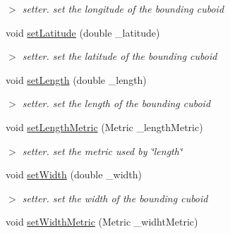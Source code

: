 \begin{DoxyCompactItemize}
\begin{DoxyCompactList}\small\item\em $>$ setter. set the longitude of the bounding cuboid \end{DoxyCompactList}\item 
\hypertarget{classCuboid_a723c412d9beb6e6e4cba2d743fb62f2a}{void \hyperlink{classCuboid_a723c412d9beb6e6e4cba2d743fb62f2a}{set\-Latitude} (double \-\_\-latitude)}\label{classCuboid_a723c412d9beb6e6e4cba2d743fb62f2a}

\begin{DoxyCompactList}\small\item\em $>$ setter. set the latitude of the bounding cuboid \end{DoxyCompactList}\item 
\hypertarget{classCuboid_afd2a9a5c2037b7f741301893436c5c95}{void \hyperlink{classCuboid_afd2a9a5c2037b7f741301893436c5c95}{set\-Length} (double \-\_\-length)}\label{classCuboid_afd2a9a5c2037b7f741301893436c5c95}

\begin{DoxyCompactList}\small\item\em $>$ setter. set the length of the bounding cuboid \end{DoxyCompactList}\item 
\hypertarget{classCuboid_a95e113f2dc9d6bfc7c40882e2461d737}{void \hyperlink{classCuboid_a95e113f2dc9d6bfc7c40882e2461d737}{set\-Length\-Metric} (\-Metric \-\_\-length\-Metric)}\label{classCuboid_a95e113f2dc9d6bfc7c40882e2461d737}

\begin{DoxyCompactList}\small\item\em $>$ setter. set the metric used by \char`\"{}length\char`\"{} \end{DoxyCompactList}\item 
\hypertarget{classCuboid_a46efc5a1a0ad31c8e40269c10837a394}{void \hyperlink{classCuboid_a46efc5a1a0ad31c8e40269c10837a394}{set\-Width} (double \-\_\-width)}\label{classCuboid_a46efc5a1a0ad31c8e40269c10837a394}

\begin{DoxyCompactList}\small\item\em $>$ setter. set the width of the bounding cuboid \end{DoxyCompactList}\item 
\hypertarget{classCuboid_ac63f89feef84839069d5708f51bda9c3}{void \hyperlink{classCuboid_ac63f89feef84839069d5708f51bda9c3}{set\-Width\-Metric} (\-Metric \-\_\-widht\-Metric)}\label{classCuboid_ac63f89feef84839069d5708f51bda9c3}


\end{DoxyCompactItemize}
